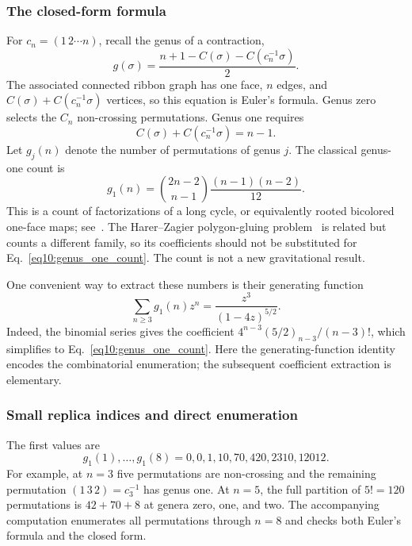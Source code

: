 \documentclass[11pt,letterpaper]{article}
\theoremstyle{plain}
\theoremstyle{definition}
\theoremstyle{remark}
\begin{document}
\subsubsection{The closed-form formula}
For $c_n=(1\,2\cdots n)$, recall the genus of a contraction,
\begin{equation}
 g(\sigma)=\frac{n+1-C(\sigma)-C(c_n^{-1}\sigma)}2.
 \label{eq10:genus_formula}
\end{equation}
The associated connected ribbon graph has one face, $n$ edges, and
$C(\sigma)+C(c_n^{-1}\sigma)$ vertices, so this equation is Euler's formula.
Genus zero selects the $C_n$ non-crossing permutations.  Genus one requires
\begin{equation}
 C(\sigma)+C(c_n^{-1}\sigma)=n-1.
 \label{eq10:genus_one_condition}
\end{equation}
Let $g_j(n)$ denote the number of permutations of genus $j$.  The classical
genus-one count is
\begin{equation}
 \boxed{g_1(n)=\binom{2n-2}{n-1}\frac{(n-1)(n-2)}{12}.}
 \label{eq10:genus_one_count}
\end{equation}
This is a count of factorizations of a long cycle, or equivalently rooted
bicolored one-face maps; see~\citet{goupilschaeffer1998,corihetyei2014}.
The Harer--Zagier polygon-gluing problem~\citep{harerzagier1986} is related
but counts a different family, so its coefficients should not be substituted
for Eq.~\eqref{eq10:genus_one_count}.  The count is not a new gravitational
result.

One convenient way to extract these numbers is their generating function
\begin{equation}
 \sum_{n\geq3}g_1(n)z^n=\frac{z^3}{(1-4z)^{5/2}}.
 \label{eq10:genus_one_generating}
\end{equation}
Indeed, the binomial series gives the coefficient
$4^{n-3}(5/2)_{n-3}/(n-3)!$, which simplifies to
Eq.~\eqref{eq10:genus_one_count}.  Here the generating-function identity
encodes the combinatorial enumeration; the subsequent coefficient extraction
is elementary.

\subsubsection{Small replica indices and direct enumeration}
The first values are
\begin{equation}
 g_1(1),\ldots,g_1(8)=0,0,1,10,70,420,2310,12012.
 \label{eq10:genus_one_sequence}
\end{equation}
For example, at $n=3$ five permutations are non-crossing and the remaining
permutation $(1\,3\,2)=c_3^{-1}$ has genus one.  At $n=5$, the full
partition of $5!=120$ permutations is $42+70+8$ at genera zero, one, and two.
The accompanying computation enumerates all permutations through $n=8$ and
checks both Euler's formula and the closed form.
\end{document}
